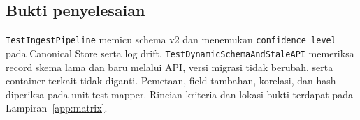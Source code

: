 \subsection{Bukti penyelesaian}
\texttt{TestIngestPipeline} memicu schema v2 dan menemukan \texttt{confidence\_level} pada Canonical Store serta log drift. \texttt{TestDynamicSchemaAndStaleAPI} memeriksa record skema lama dan baru melalui API, versi migrasi tidak berubah, serta container terkait tidak diganti. Pemetaan, field tambahan, korelasi, dan hash diperiksa pada unit test mapper. Rincian kriteria dan lokasi bukti terdapat pada Lampiran~\ref{app:matrix}.
